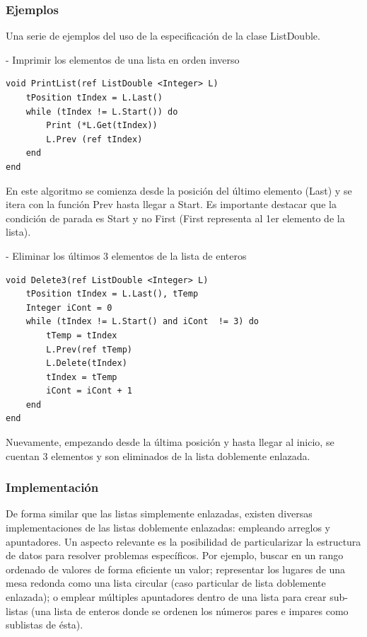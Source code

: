 \subsubsection{Ejemplos}

Una serie de ejemplos del uso de la especificación de la clase ListDouble.

- Imprimir los elementos de una lista en orden inverso 
\begin{lstlisting}[upquote=true, language=pseudo]
void PrintList(ref ListDouble <Integer> L) 
    tPosition tIndex = L.Last()
    while (tIndex != L.Start()) do
        Print (*L.Get(tIndex)) 
        L.Prev (ref tIndex) 
    end 
end
\end{lstlisting}

En este algoritmo se comienza desde la posición del último elemento (Last) y se itera con la función Prev hasta llegar a Start. Es importante destacar que la condición de parada es Start y no First (First representa al 1er elemento de la lista).

- Eliminar los últimos 3 elementos de la lista de enteros
\begin{lstlisting}[upquote=true, language=pseudo]
void Delete3(ref ListDouble <Integer> L) 
    tPosition tIndex = L.Last(), tTemp
    Integer iCont = 0 
    while (tIndex != L.Start() and iCont  != 3) do
        tTemp = tIndex 
        L.Prev(ref tTemp)
        L.Delete(tIndex) 
        tIndex = tTemp 
        iCont = iCont + 1
    end
end
\end{lstlisting}

Nuevamente, empezando desde la última posición y hasta llegar al inicio, se cuentan 3 elementos y son eliminados de la lista doblemente enlazada.

\subsubsection{Implementación}

De forma similar que las listas simplemente enlazadas, existen diversas implementaciones de las listas doblemente enlazadas: empleando arreglos y apuntadores. Un aspecto relevante es la posibilidad de particularizar la estructura de datos para resolver problemas específicos. Por ejemplo, buscar en un rango ordenado de valores de forma eficiente un valor; representar los lugares de una mesa redonda como una lista circular (caso particular de lista doblemente enlazada); o emplear múltiples apuntadores dentro de una lista para crear sub-listas (una lista de enteros donde se ordenen los números pares e impares como sublistas de ésta).

